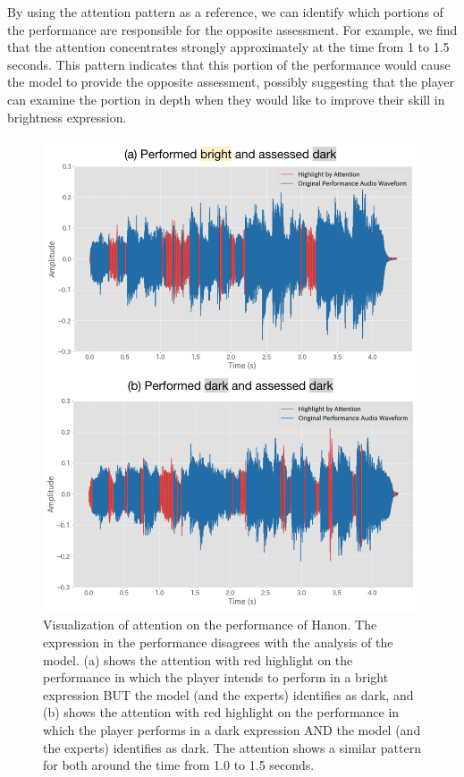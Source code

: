 \documentclass[sigconf,review,anonymous]{acmart}
\begin{document}
By using the attention pattern as a reference, we can identify which portions of the performance are responsible for the opposite assessment. 
For example, we find that the attention concentrates strongly approximately at the time from 1 to 1.5 seconds.
This pattern indicates that this portion of the performance would cause the model to provide the opposite assessment, possibly suggesting that the player can examine the portion in depth when they would like to improve their skill in brightness expression.

\begin{figure}[h!]
  \centering
  \includegraphics[width=\linewidth]{figures/highlight_audio_17_hanon.png}
  \caption{Visualization of attention on the performance of Hanon. The expression in the performance disagrees with the analysis of the model. (a) shows the attention with red highlight on the performance in which the player intends to perform in a bright expression BUT the model (and the experts) identifies as dark, and (b) shows the attention with red highlight on the performance in which the player performs in a dark expression AND the model (and the experts) identifies as dark. The attention shows a similar pattern for both around the time from 1.0 to 1.5 seconds.}
  \Description{}
  \label{highlight_audio_17_hanon}
\end{figure}
\end{document}
